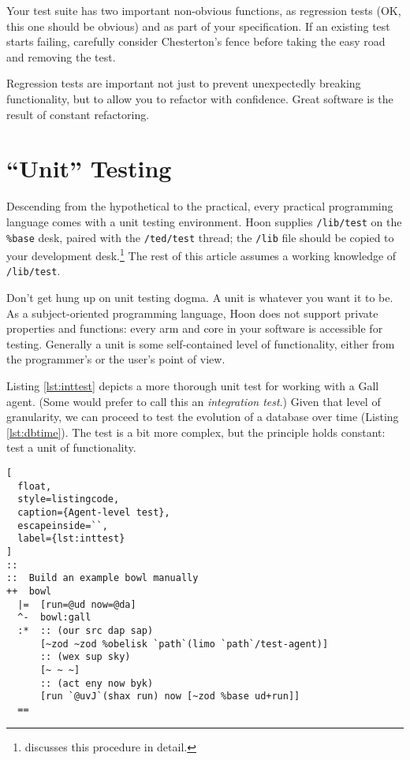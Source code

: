 \documentclass[twoside]{article}
\begin{document}
Your test suite has two important non-obvious functions, as regression tests (OK, this one should be obvious) and as part of your specification. If an existing test starts failing, carefully consider Chesterton's fence \citep{WikipediaChesterton} before taking the easy road and removing the test.

Regression tests are important not just to prevent unexpectedly breaking functionality, but to allow you to refactor with confidence. Great software is the result of constant refactoring.

\section{“Unit” Testing}

Descending from the hypothetical to the practical, every practical programming language comes with a unit testing environment. Hoon supplies \texttt{/lib/test} on the \texttt{\%base} desk, paired with the \texttt{/ted/test} thread; the \texttt{/lib} file should be copied to your development desk.\footnote{\citet{Davis2022} discusses this procedure in detail.} The rest of this article assumes a working knowledge of \texttt{/lib/test}.

Don't get hung up on unit testing dogma. A unit is whatever you want it to be. As a subject-oriented programming language, Hoon does not support private properties and functions: every arm and core in your software is accessible for testing. Generally a unit is some self-contained level of functionality, either from the programmer's or the user's point of view.

Listing \ref{lst:inttest} depicts a more thorough unit test for working with a Gall agent.  (Some would prefer to call this an \emph{integration test}.)  Given that level of granularity, we can proceed to test the evolution of a database over time (Listing \ref{lst:dbtime}).  The test is a bit more complex, but the principle holds constant:  test a unit of functionality.

\begin{lstlisting}[
  float,
  style=listingcode,
  caption={Agent-level test},
  escapeinside=``,
  label={lst:inttest}
]
::
::  Build an example bowl manually
++  bowl
  |=  [run=@ud now=@da]
  ^-  bowl:gall
  :*  :: (our src dap sap)
      [~zod ~zod %obelisk `path`(limo `path`/test-agent)]
      :: (wex sup sky)
      [~ ~ ~]
      :: (act eny now byk)
      [run `@uvJ`(shax run) now [~zod %base ud+run]]
  ==
\end{lstlisting}
\end{document}
